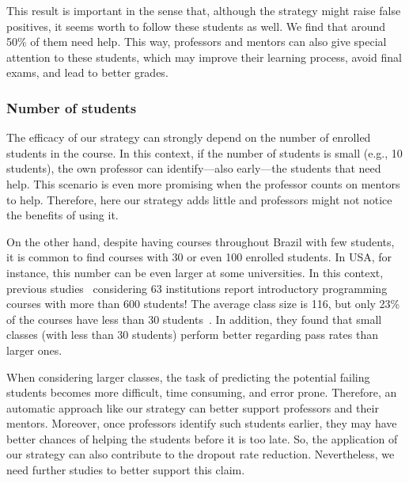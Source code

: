 This result is important in the sense that, although the strategy might raise false positives, it seems worth to follow these students as well. We find that around 50\% of them need help. This way, professors and mentors can also give special attention to these students, which may improve their learning process, avoid final exams, and lead to better grades.

\subsubsection{Number of students}

The efficacy of our strategy can strongly depend on the number of enrolled students in the course. In this context, if the number of students is small (e.g., 10 students), the own professor can identify---also early---the students that need help. This scenario is even more promising when the professor counts on mentors to help. Therefore, here our strategy adds little and professors might not notice the benefits of using it.

On the other hand, despite having courses throughout Brazil with few students, it is common to find courses with 30 or even 100 enrolled students. In USA, for instance, this number can be even larger at some universities. In this context, previous studies~\cite{bennedsen-sigcse-failure-rates-2007} considering 63 institutions report introductory programming courses with more than 600 students! The average class size is 116, but only 23\% of the courses have less than 30 students~\cite{bennedsen-sigcse-failure-rates-2007}. In addition, they found that small classes (with less than 30 students) perform better regarding pass rates than larger ones.

When considering larger classes, the task of predicting the potential failing students becomes more difficult, time consuming, and error prone. Therefore, an automatic approach like our strategy can better support professors and their mentors. Moreover, once professors identify such students earlier, they may have better chances of helping the students before it is too late. So, the application of our strategy can also contribute to the dropout rate reduction. Nevertheless, we need further studies to better support this claim.


